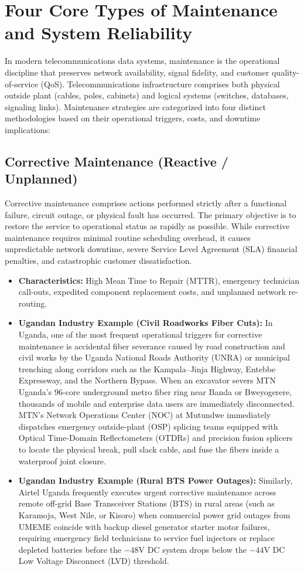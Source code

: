 \documentclass[12pt,a4paper]{report}
\begin{document}
\section{Four Core Types of Maintenance and System Reliability}
In modern telecommunications data systems, maintenance is the operational discipline that preserves network availability, signal fidelity, and customer quality-of-service (QoS). Telecommunications infrastructure comprises both physical outside plant (cables, poles, cabinets) and logical systems (switches, databases, signaling links). Maintenance strategies are categorized into four distinct methodologies based on their operational triggers, costs, and downtime implications:

\subsection{Corrective Maintenance (Reactive / Unplanned)}
Corrective maintenance comprises actions performed strictly after a functional failure, circuit outage, or physical fault has occurred. The primary objective is to restore the service to operational status as rapidly as possible. While corrective maintenance requires minimal routine scheduling overhead, it causes unpredictable network downtime, severe Service Level Agreement (SLA) financial penalties, and catastrophic customer dissatisfaction.
\begin{itemize}
    \item \textbf{Characteristics:} High Mean Time to Repair (MTTR), emergency technician call-outs, expedited component replacement costs, and unplanned network re-routing.
    \item \textbf{Ugandan Industry Example (Civil Roadworks Fiber Cuts):} In Uganda, one of the most frequent operational triggers for corrective maintenance is accidental fiber severance caused by road construction and civil works by the Uganda National Roads Authority (UNRA) or municipal trenching along corridors such as the Kampala--Jinja Highway, Entebbe Expressway, and the Northern Bypass. When an excavator severs MTN Uganda's 96-core underground metro fiber ring near Banda or Bweyogerere, thousands of mobile and enterprise data users are immediately disconnected. MTN's Network Operations Center (NOC) at Mutundwe immediately dispatches emergency outside-plant (OSP) splicing teams equipped with Optical Time-Domain Reflectometers (OTDRs) and precision fusion splicers to locate the physical break, pull slack cable, and fuse the fibers inside a waterproof joint closure.
    \item \textbf{Ugandan Industry Example (Rural BTS Power Outages):} Similarly, Airtel Uganda frequently executes urgent corrective maintenance across remote off-grid Base Transceiver Stations (BTS) in rural areas (such as Karamoja, West Nile, or Kisoro) when commercial power grid outages from UMEME coincide with backup diesel generator starter motor failures, requiring emergency field technicians to service fuel injectors or replace depleted batteries before the $-48\text{V DC}$ system drops below the $-44\text{V DC}$ Low Voltage Disconnect (LVD) threshold.
\end{itemize}
\end{document}
